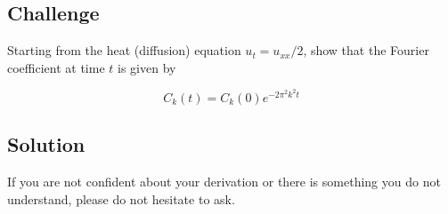 \subsection*{Challenge}
Starting from the heat (diffusion) equation $u_t = u_{xx}/2$, show that the Fourier coefficient at time $t$ is given by

\begin{equation}
    C_k(t) = C_k(0) e^{-2 \pi^2 k^2 t}
\end{equation}


\subsection*{Solution}
If you are not confident about your derivation or there is something you do not understand, please do not hesitate to ask.

\timebox





